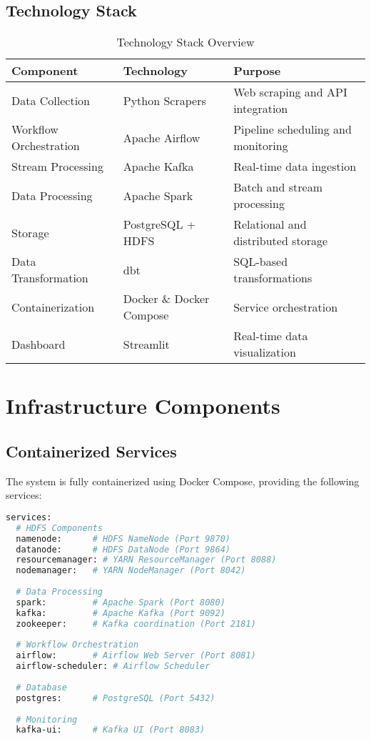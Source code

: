 \documentclass[12pt,a4paper]{article}
\begin{document}
\subsection{Technology Stack}

\begin{table}[H]
\centering
\begin{tabular}{|l|l|l|}
\hline
\textbf{Component} & \textbf{Technology} & \textbf{Purpose} \\
\hline
Data Collection & Python Scrapers & Web scraping and API integration \\
\hline
Workflow Orchestration & Apache Airflow & Pipeline scheduling and monitoring \\
\hline
Stream Processing & Apache Kafka & Real-time data ingestion \\
\hline
Data Processing & Apache Spark & Batch and stream processing \\
\hline
Storage & PostgreSQL + HDFS & Relational and distributed storage \\
\hline
Data Transformation & dbt & SQL-based transformations \\
\hline
Containerization & Docker \& Docker Compose & Service orchestration \\
\hline
Dashboard & Streamlit & Real-time data visualization \\
\hline
\end{tabular}
\caption{Technology Stack Overview}
\label{tab:tech-stack}
\end{table}

\section{Infrastructure Components}

\subsection{Containerized Services}
The system is fully containerized using Docker Compose, providing the following services:

\begin{lstlisting}[language=bash, caption=Docker Compose Services]
services:
  # HDFS Components
  namenode:      # HDFS NameNode (Port 9870)
  datanode:      # HDFS DataNode (Port 9864)
  resourcemanager: # YARN ResourceManager (Port 8088)
  nodemanager:   # YARN NodeManager (Port 8042)
  
  # Data Processing
  spark:         # Apache Spark (Port 8080)
  kafka:         # Apache Kafka (Port 9092)
  zookeeper:     # Kafka coordination (Port 2181)
  
  # Workflow Orchestration
  airflow:       # Airflow Web Server (Port 8081)
  airflow-scheduler: # Airflow Scheduler
  
  # Database
  postgres:      # PostgreSQL (Port 5432)
  
  # Monitoring
  kafka-ui:      # Kafka UI (Port 8083)
\end{lstlisting}
\end{document}
